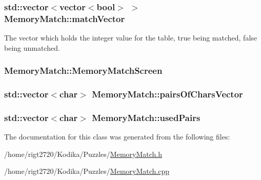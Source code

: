 \hypertarget{classMemoryMatch_ac42fc8b5ac8b04bd0651222fa31d2251}{
\subsubsection[{match\-Vector}]{\setlength{\rightskip}{0pt plus 5cm}std\-::vector$<$vector$<$bool$>$ $>$ Memory\-Match\-::match\-Vector\hspace{0.3cm}{\ttfamily [private]}}}\label{classMemoryMatch_ac42fc8b5ac8b04bd0651222fa31d2251}
The vector which holds the integer value for the table, true being matched, false being unmatched. \hypertarget{classMemoryMatch_a78399975fec5fea7b2102449a4536fcd}{
\subsubsection[{Memory\-Match\-Screen}]{ Memory\-Match\-::\-Memory\-Match\-Screen\hspace{0.3cm}{\ttfamily [private]}}}\label{classMemoryMatch_a78399975fec5fea7b2102449a4536fcd}
\hypertarget{classMemoryMatch_a80336b0b989152fed590a6fa755197bc}{
\subsubsection[{pairs\-Of\-Chars\-Vector}]{\setlength{\rightskip}{0pt plus 5cm}std\-::vector$<$char$>$ Memory\-Match\-::pairs\-Of\-Chars\-Vector\hspace{0.3cm}{\ttfamily [private]}}}\label{classMemoryMatch_a80336b0b989152fed590a6fa755197bc}
\hypertarget{classMemoryMatch_adcb66679aaceb1414fe023d065863d2f}{
\subsubsection[{used\-Pairs}]{\setlength{\rightskip}{0pt plus 5cm}std\-::vector$<$char$>$ Memory\-Match\-::used\-Pairs\hspace{0.3cm}{\ttfamily [private]}}}\label{classMemoryMatch_adcb66679aaceb1414fe023d065863d2f}


The documentation for this class was generated from the following files\-:\begin{DoxyCompactItemize}
\item 
/home/rigt2720/\-Kodika/\-Puzzles/\hyperlink{MemoryMatch_8h}{Memory\-Match.\-h}\item 
/home/rigt2720/\-Kodika/\-Puzzles/\hyperlink{MemoryMatch_8cpp}{Memory\-Match.\-cpp}\end{DoxyCompactItemize}

